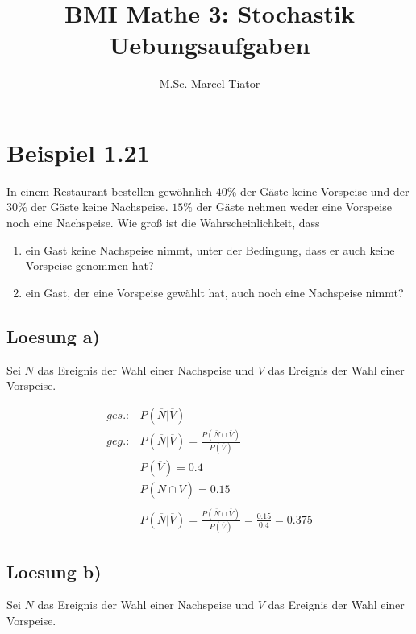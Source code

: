 \documentclass[]{article}
\title{BMI Mathe 3: Stochastik Uebungsaufgaben}
\author{M.Sc. Marcel Tiator}
\begin{document}
\maketitle
	
\section{Beispiel 1.21}

In einem Restaurant bestellen gewöhnlich $40\%$ der Gäste keine Vorspeise und der $30\%$ der Gäste keine Nachspeise. $15\%$ der Gäste nehmen weder eine Vorspeise noch eine Nachspeise. Wie groß ist die Wahrscheinlichkeit, dass

\begin{enumerate}[label=\alph*)]
	\item ein Gast keine Nachspeise nimmt, unter der Bedingung, dass er auch keine Vorspeise genommen hat?
	\item ein Gast, der eine Vorspeise gewählt hat, auch noch eine Nachspeise nimmt? 
\end{enumerate}

\subsection{Loesung a)}

Sei $N$ das Ereignis der Wahl einer Nachspeise und $V$ das Ereignis der Wahl einer Vorspeise. 

\begin{equation}
	\begin{split}
		ges.: & P(\overline{N} \vert \overline{V}) \\
		geg.: & P(\overline{N} \vert \overline{V}) = \frac{P(\overline{N} \cap \overline{V})}{P(\overline{V})} \\
		& P(\overline{V}) = 0.4 \\
		& P(\overline{N} \cap \overline{V}) = 0.15 \\
		& \\
		& P(\overline{N} \vert \overline{V}) = \frac{P(\overline{N} \cap \overline{V})}{P(\overline{V})} = \frac{0.15}{0.4} = 0.375
	\end{split}
\end{equation}

\subsection{Loesung b)}

Sei $N$ das Ereignis der Wahl einer Nachspeise und $V$ das Ereignis der Wahl einer Vorspeise. 
\end{document}
